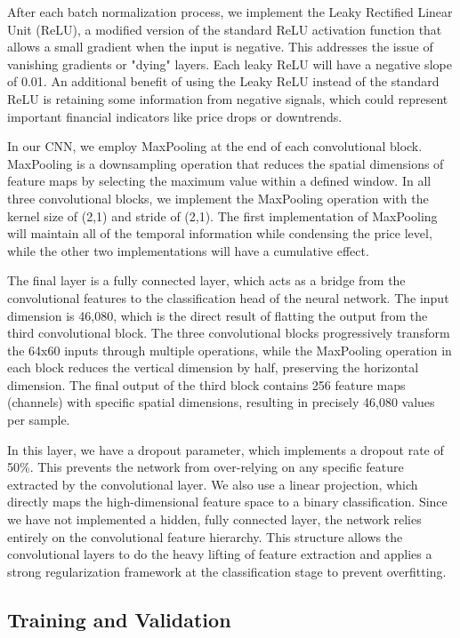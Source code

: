 \documentclass[12pt]{article}
\begin{document}
After each batch normalization process, we implement the Leaky Rectified Linear Unit (ReLU), a modified version of the standard ReLU activation function that allows a small gradient when the input is negative. This addresses the issue of vanishing gradients or "dying" layers. Each leaky ReLU will have a negative slope of 0.01. An additional benefit of using the Leaky ReLU instead of the standard ReLU is retaining some information from negative signals, which could represent important financial indicators like price drops or downtrends.

In our CNN, we employ MaxPooling at the end of each convolutional block. MaxPooling is a downsampling operation that reduces the spatial dimensions of feature maps by selecting the maximum value within a defined window. In all three convolutional blocks, we implement the MaxPooling operation with the kernel size of (2,1) and stride of (2,1). The first implementation of MaxPooling will maintain all of the temporal information while condensing the price level, while the other two implementations will have a cumulative effect.

The final layer is a fully connected layer, which acts as a bridge from the convolutional features to the classification head of the neural network. The input dimension is 46,080, which is the direct result of flatting the output from the third convolutional block. The three convolutional blocks progressively transform the 64x60 inputs through multiple operations, while the MaxPooling operation in each block reduces the vertical dimension by half, preserving the horizontal dimension. The final output of the third block contains 256 feature maps (channels) with specific spatial dimensions, resulting in precisely 46,080 values per sample.

In this layer, we have a dropout parameter, which implements a dropout rate of 50\%. This prevents the network from over-relying on any specific feature extracted by the convolutional layer. We also use a linear projection, which directly maps the high-dimensional feature space to a binary classification. Since we have not implemented a hidden, fully connected layer, the network relies entirely on the convolutional feature hierarchy. This structure allows the convolutional layers to do the heavy lifting of feature extraction and applies a strong regularization framework at the classification stage to prevent overfitting.


\subsection*{Training and Validation}
\end{document}
